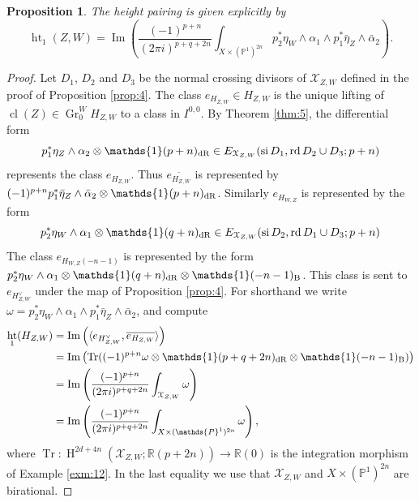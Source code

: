 \documentclass[11pt,a4paper]{amsart}
\newcommand{\Betti}{\text{\rm B}}
\newcommand{\dR}{\text{\rm dR}}
\renewcommand{\P}{\mathds{P}}
\newcommand{\R}{\mathds{R}}
\newcommand{\caX}{\mathcal{X}}
\newcommand{\bfone}{{\mathds{1}}}
\DeclareMathOperator {\Gr} {Gr}
\DeclareMathOperator{\im}{Im}
\DeclareMathOperator{\si}{si}
\DeclareMathOperator{\rd}{rd}
\DeclareMathOperator {\cl}{cl}
\DeclareMathOperator {\Tr}{Tr}
\DeclareMathOperator{\Ht}{ht}
\DeclareMathOperator{\rH}{H}
\numberwithin{equation}{section}
\theoremstyle{plain}
\newtheorem{prop}{Proposition}[section]
\theoremstyle{definition}
\begin{document}
  \begin{prop}\label{prop:5-13}
    The height pairing is given explicitly by
    \begin{displaymath}
      \Ht_{1}(Z,W)=\im  \left( \frac{(-1)^{p+n}}{(2\pi i)^{p+q+2n}}\int_{X\times
          (\P^{1})^{2n}} p_{2}^{\ast}\eta_{W}\wedge \alpha _{1}\wedge
        p_{1}^{\ast}\bar \eta_{Z} \wedge \bar \alpha _{2}\right).
    \end{displaymath}
 \end{prop}
  \begin{proof}
    Let $D_{1}$, $D_{2}$ and $D_{3}$ be the normal crossing divisors
    of $\caX_{Z,W}$ defined in the proof of Proposition \ref{prop:4}. 
    The class $e_{H_{Z,W}}\in H_{Z,W}$ is the unique lifting of
    $\cl(Z)\in \Gr_{0}^{W}H_{Z,W}$ to a class in $I^{0,0}$. By Theorem
    \ref{thm:5}, 
    the differential form
    \begin{displaymath}
      p_{1}^{\ast}\eta_{Z} \wedge \alpha _{2}\otimes \bfone(p+n)_{\dR}\in
      E_{\caX_{Z,W}}(\si D_{1},\rd D_{2}\cup D_{3};p+n)
    \end{displaymath}
    represents the class $e_{H_{Z,W}}$.
    Thus $\overline {e_{H_{Z,W}}}$ is represented by
    $(-1)^{p+n}p_{1}^{\ast}\bar \eta_{Z} \wedge \bar \alpha_{2}\otimes
    \bfone(p+n)_{\dR}$.
    Similarly $e_{H_{W,Z}}$ is represented by the form
    \begin{displaymath}
      p_{2}^{\ast}\eta_{W} \wedge \alpha_{1}\otimes
    \bfone(q+n)_{\dR}\in
      E_{\caX_{Z,W}}(\si D_{2},\rd D_{1}\cup D_{3};p+n)
    \end{displaymath}
    The class $e_{H_{W,Z}(-n-1)}$ is represented by the form
    $p_{2}^{\ast}\eta_{W} \wedge \alpha _{1}\otimes
    \bfone(q+n)_{\dR}\otimes \bfone(-n-1)_{\Betti}$. This class is
    sent to $e_{H_{Z,W}^{\vee}}$ under the map of Proposition
    \ref{prop:4}. For shorthand we write $\omega =p_{2}^{\ast}\eta_{W}
    \wedge \alpha _{1}\wedge
      p_{1}^{\ast}\bar \eta_{Z} \wedge \bar \alpha _{2}$, and compute  
    \begin{align*}
      \Ht_{1}(H_{Z,W})
      &=\im\left(\langle e_{H_{Z,W}^{\vee}},\overline{e_{H_{Z,W}}}\rangle\right)\\
      &=\im\left(\Tr((-1)^{p+n}\omega \otimes
      \bfone(p+q+2n)_{\dR}\otimes \bfone(-n-1)_{\Betti})\right)\\
      &=\im\left(\frac{(-1)^{p+n}}{(2\pi i)^{p+q+2n}}\int_{\caX_{Z,W}}
        \omega \right)\\
      &=\im\left(\frac{(-1)^{p+n}}{(2\pi i)^{p+q+2n}}\int_{X\times (\P^{1})^{2n}}
        \omega\right),
    \end{align*}
where $\Tr\colon \rH^{2d+4n}(\caX_{Z,W};\R(p+2n))\to \R(0)$ is the
integration morphism of Example \ref{exm:12}. In the last equality we use that $\caX_{Z,W}$
and $X\times (\P^{1})^{2n}$ are birational.
\end{proof}
\end{document}
